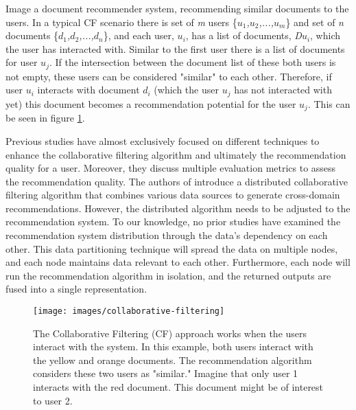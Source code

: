 Image a document recommender system, recommending similar documents to the users. In a typical CF scenario there is set of \emph{m} users \{\emph{$u_{1}$,$u_{2}$,...,$u_{m}$}\} and set of \emph{n} documents \{\emph{$d_{1}$,$d_{2}$,...,$d_{n}$}\}, and each user, \emph{$u_{i}$}, has a list of documents, \emph{D$u_{i}$}, which the user has interacted with. Similar to the first user there is a list of documents for user \emph{$u_{j}$}. If the intersection between the document list of these both users is not empty, these users can be considered "similar" to each other. Therefore, if user \emph{$u_{i}$} interacts with document \emph{$d_{i}$} (which the user \emph{$u_{j}$} has not interacted with yet) this document becomes a recommendation potential for the user \emph{$u_{j}$}. This can be seen in figure \ref{fig:collaborative-filtering}.

Previous studies have almost exclusively focused on different techniques to enhance the collaborative filtering algorithm \cite{songCollaborativeFilteringAlgorithm2019, suSurveyCollaborativeFiltering2009} and ultimately the recommendation quality for a user. Moreover, they discuss multiple evaluation metrics to assess the recommendation quality. The authors of \cite{bouadjenekDistributedCollaborativeFiltering2018} introduce a distributed collaborative filtering algorithm that combines various data sources to generate cross-domain recommendations. However, the distributed algorithm needs to be adjusted to the recommendation system. To our knowledge, no prior studies have examined the recommendation system distribution through the data's dependency on each other. This data partitioning technique will spread the data on multiple nodes, and each node maintains data relevant to each other. Furthermore, each node will run the recommendation algorithm in isolation, and the returned outputs are fused into a single representation.



\begin{figure}[!htb]
    \centering
    \texttt{[image: images/collaborative-filtering]}
    \caption{The Collaborative Filtering (CF) approach works when the users interact with the system. In this example, both users interact with the yellow and orange documents. The recommendation algorithm considers these two users as "similar." Imagine that only user 1 interacts with the red document. This document might be of interest to user 2.}
    \label{fig:collaborative-filtering}
\end{figure}



